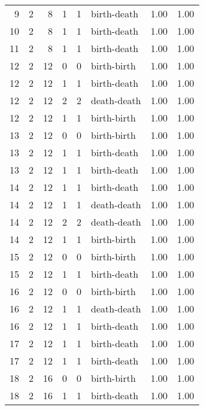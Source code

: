 \documentclass{article}
\begin{document}
\begin{center}
\begin{tabular}{rrrrrlrr}
9 & 2 & 8 & 1 & 1 & birth-death & 1.00 & 1.00 \\
10 & 2 & 8 & 1 & 1 & birth-death & 1.00 & 1.00 \\
11 & 2 & 8 & 1 & 1 & birth-death & 1.00 & 1.00 \\
12 & 2 & 12 & 0 & 0 & birth-birth & 1.00 & 1.00 \\
12 & 2 & 12 & 1 & 1 & birth-death & 1.00 & 1.00 \\
12 & 2 & 12 & 2 & 2 & death-death & 1.00 & 1.00 \\
12 & 2 & 12 & 1 & 1 & birth-birth & 1.00 & 1.00 \\
13 & 2 & 12 & 0 & 0 & birth-birth & 1.00 & 1.00 \\
13 & 2 & 12 & 1 & 1 & birth-death & 1.00 & 1.00 \\
13 & 2 & 12 & 1 & 1 & birth-death & 1.00 & 1.00 \\
14 & 2 & 12 & 1 & 1 & birth-death & 1.00 & 1.00 \\
14 & 2 & 12 & 1 & 1 & death-death & 1.00 & 1.00 \\
14 & 2 & 12 & 2 & 2 & death-death & 1.00 & 1.00 \\
14 & 2 & 12 & 1 & 1 & birth-birth & 1.00 & 1.00 \\
15 & 2 & 12 & 0 & 0 & birth-birth & 1.00 & 1.00 \\
15 & 2 & 12 & 1 & 1 & birth-death & 1.00 & 1.00 \\
16 & 2 & 12 & 0 & 0 & birth-birth & 1.00 & 1.00 \\
16 & 2 & 12 & 1 & 1 & death-death & 1.00 & 1.00 \\
16 & 2 & 12 & 1 & 1 & birth-death & 1.00 & 1.00 \\
17 & 2 & 12 & 1 & 1 & birth-death & 1.00 & 1.00 \\
17 & 2 & 12 & 1 & 1 & birth-death & 1.00 & 1.00 \\
18 & 2 & 16 & 0 & 0 & birth-birth & 1.00 & 1.00 \\
18 & 2 & 16 & 1 & 1 & birth-death & 1.00 & 1.00 \\
\bottomrule
\end{tabular}


\end{center}
\end{document}

